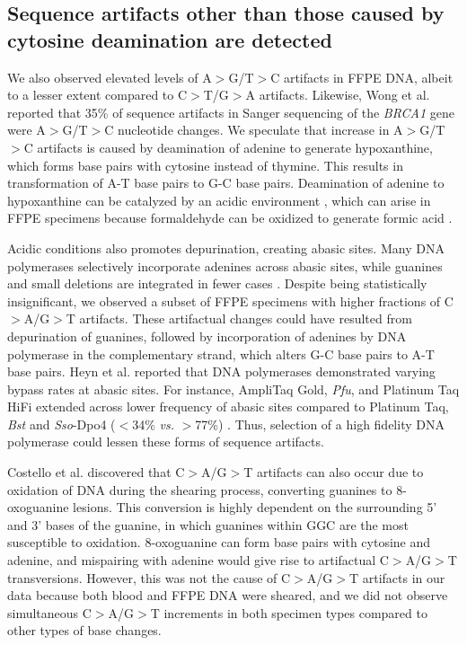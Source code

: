 \subsection{Sequence artifacts other than those caused by cytosine deamination are detected}

We also observed elevated levels of A$>$G/T$>$C artifacts in FFPE DNA, albeit to a lesser extent compared to C$>$T/G$>$A artifacts. Likewise, Wong et al. \cite{Wong1998} reported that 35\% of sequence artifacts in Sanger sequencing of the \textit{BRCA1} gene were A$>$G/T$>$C nucleotide changes. We speculate that increase in A$>$G/T$>$C artifacts is caused by deamination of adenine to generate hypoxanthine, which forms base pairs with cytosine instead of thymine. This results in transformation of A-T base pairs to G-C base pairs. Deamination of adenine to hypoxanthine can be catalyzed by an acidic environment \cite{Wang2010}, which can arise in FFPE specimens because formaldehyde can be oxidized to generate formic acid \cite{Do2015a}.

Acidic conditions also promotes depurination, creating abasic sites. Many DNA polymerases selectively incorporate adenines across abasic sites, while guanines and small deletions are integrated in fewer cases \cite{Heyn2010}. Despite being statistically insignificant, we observed a subset of FFPE specimens with higher fractions of C$>$A/G$>$T artifacts. These artifactual changes could have resulted from depurination of guanines, followed by incorporation of adenines by DNA polymerase in the complementary strand, which alters G-C base pairs to A-T base pairs. Heyn et al. \cite{Heyn2010} reported that DNA polymerases demonstrated varying bypass rates at abasic sites. For instance, AmpliTaq Gold, \textit{Pfu}, and Platinum Taq HiFi extended across lower frequency of abasic sites compared to Platinum Taq, \textit{Bst} and \textit{Sso}-Dpo4 ($<$34\% \textit{vs.} $>$77\%) \cite{Heyn2010}. Thus, selection of a high fidelity DNA polymerase could lessen these forms of sequence artifacts.

Costello et al. \cite{Costello2013} discovered that C$>$A/G$>$T artifacts can also occur due to oxidation of DNA during the shearing process, converting guanines to 8-oxoguanine lesions. This conversion is highly dependent on the surrounding 5' and 3' bases of the guanine, in which guanines within GGC are the most susceptible to oxidation. 8-oxoguanine can form base pairs with cytosine and adenine, and mispairing with adenine would give rise to artifactual C$>$A/G$>$T transversions. However, this was not the cause of C$>$A/G$>$T artifacts in our data because both blood and FFPE DNA were sheared, and we did not observe simultaneous C$>$A/G$>$T increments in both specimen types compared to other types of base changes.

